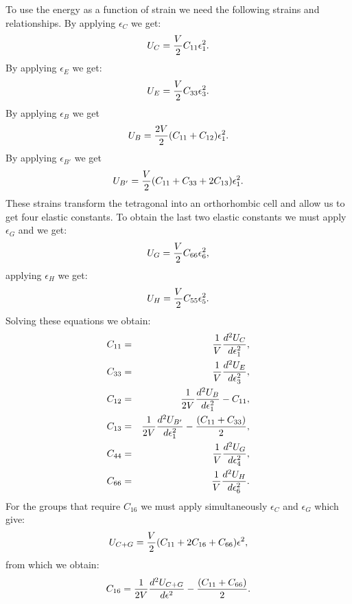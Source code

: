 \documentclass[12pt,a4paper,twoside]{report}
\begin{document}
To use the energy as a function of strain 
we need the following strains and relationships. 
By applying $\epsilon_C$ we get:
\begin{equation}
U_C= {V \over 2} C_{11} \epsilon_1^2.
\end{equation}
By applying $\epsilon_E$ we get:
\begin{equation}
U_E= {V \over 2} C_{33} \epsilon_3^2.
\end{equation}
By applying $\epsilon_B$ we get
\begin{equation}
U_B= {2 V \over 2} (C_{11} + C_{12}) \epsilon_1^2.
\end{equation}
By applying $\epsilon_{B'}$ we get
\begin{equation}
U_{B'}= {V \over 2} (C_{11} + C_{33} + 2 C_{13}) \epsilon_1^2.
\end{equation}
These strains transform the tetragonal into an orthorhombic cell 
and allow us to get four elastic constants. 
To obtain the last two elastic constants we 
must apply $\epsilon_G$ and we get:
\begin{equation}
U_G= {V \over 2} C_{66} \epsilon_6^2,
\end{equation}
applying $\epsilon_H$ we get:
\begin{equation}
U_H= {V \over 2} C_{55} \epsilon_5^2.
\end{equation}
Solving these equations we obtain:
\begin{eqnarray}
C_{11}&=&{1 \over V} {d^2 U_C \over d \epsilon_1^2}, \\ 
C_{33}&=&{1 \over V} {d^2 U_E \over d \epsilon_3^2}, \\ 
C_{12}&=&{1 \over 2 V} {d^2 U_B \over d \epsilon_1^2} - C_{11}, \\
C_{13}&=&{1 \over 2 V} {d^2 U_{B'} \over d \epsilon_1^2} - 
{(C_{11} +C_{33})\over 2}, \\
C_{44}&=&{1 \over V} {d^2 U_G \over d \epsilon_4^2}, \\
C_{66}&=&{1 \over V} {d^2 U_H \over d \epsilon_6^2}.
\end{eqnarray}
For the groups that require $C_{16}$ we must apply simultaneously $\epsilon_C$
and $\epsilon_G$ which give:
\begin{equation}
U_{C+G}={V \over 2} (C_{11}+2C_{16}+C_{66})\epsilon^2,
\end{equation}
from which we obtain:
\begin{equation}
C_{16}={1 \over 2V} {d^2 U_{C+G} \over d \epsilon^2} - {(C_{11}+C_{66})\over 2}.
\end{equation}
\end{document}
